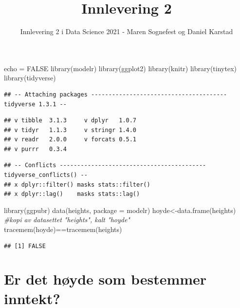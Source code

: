 \documentclass[
  12pt,
  norsk,
]{article}
\title{Innlevering 2}
\author{Innlevering 2 i Data Science 2021 - Maren Sognefest og Daniel
Karstad}
\date{}
\newenvironment{Shaded}{\begin{snugshade}}{\end{snugshade}}
\newcommand{\AttributeTok}[1]{\textcolor[rgb]{0.77,0.63,0.00}{#1}}
\newcommand{\CommentTok}[1]{\textcolor[rgb]{0.56,0.35,0.01}{\textit{#1}}}
\newcommand{\ConstantTok}[1]{\textcolor[rgb]{0.00,0.00,0.00}{#1}}
\newcommand{\FunctionTok}[1]{\textcolor[rgb]{0.00,0.00,0.00}{#1}}
\newcommand{\NormalTok}[1]{#1}
\newcommand{\OtherTok}[1]{\textcolor[rgb]{0.56,0.35,0.01}{#1}}
\newcommand{\SpecialCharTok}[1]{\textcolor[rgb]{0.00,0.00,0.00}{#1}}
\newcommand{\StringTok}[1]{\textcolor[rgb]{0.31,0.60,0.02}{#1}}
\begin{document}
\maketitle

\begin{Shaded}
\begin{Highlighting}[]
\NormalTok{echo }\OtherTok{=} \ConstantTok{FALSE} 
\FunctionTok{library}\NormalTok{(modelr) }
\FunctionTok{library}\NormalTok{(ggplot2) }
\FunctionTok{library}\NormalTok{(knitr) }
\FunctionTok{library}\NormalTok{(tinytex) }
\FunctionTok{library}\NormalTok{(tidyverse) }
\end{Highlighting}
\end{Shaded}

\begin{verbatim}
## -- Attaching packages --------------------------------------- tidyverse 1.3.1 --
\end{verbatim}

\begin{verbatim}
## v tibble  3.1.3     v dplyr   1.0.7
## v tidyr   1.1.3     v stringr 1.4.0
## v readr   2.0.0     v forcats 0.5.1
## v purrr   0.3.4
\end{verbatim}

\begin{verbatim}
## -- Conflicts ------------------------------------------ tidyverse_conflicts() --
## x dplyr::filter() masks stats::filter()
## x dplyr::lag()    masks stats::lag()
\end{verbatim}

\begin{Shaded}
\begin{Highlighting}[]
\FunctionTok{library}\NormalTok{(ggpubr)}
\FunctionTok{data}\NormalTok{(}\StringTok{\textquotesingle{}heights\textquotesingle{}}\NormalTok{, }\AttributeTok{package =} \StringTok{\textquotesingle{}modelr\textquotesingle{}}\NormalTok{)}
\NormalTok{hoyde}\OtherTok{\textless{}{-}}\FunctionTok{data.frame}\NormalTok{(heights) }\CommentTok{\#kopi av datasettet "heights", kalt "hoyde"}
\FunctionTok{tracemem}\NormalTok{(hoyde)}\SpecialCharTok{==}\FunctionTok{tracemem}\NormalTok{(heights)}
\end{Highlighting}
\end{Shaded}

\begin{verbatim}
## [1] FALSE
\end{verbatim}

\hypertarget{er-det-huxf8yde-som-bestemmer-inntekt}{%
\section{Er det høyde som bestemmer
inntekt?}\label{er-det-huxf8yde-som-bestemmer-inntekt}}
\end{document}
